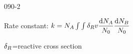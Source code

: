 \begin{mitframe}{090-2}
 \begin{listone}
	\item Rate constant: $\thermcond=\nummoles_{\helmholtz}\int\int\blthick_{\gasconst}\vvel\dfrac{\mathrm{d}\nummoles_{\helmholtz}}{\nummoles_{\init}}\dfrac{\mathrm{d}\nummoles_{\exergy}}{\nummoles_{\init}}$
    	\begin{listtwo}
        	\item $\blthick_{\gasconst}$=reactive cross section
        \end{listtwo}
\end{listone}   
\end{mitframe}
